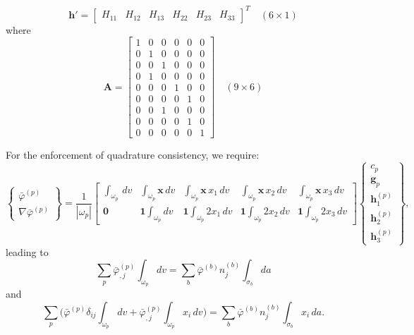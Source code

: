 \documentclass[11pt]{article} %
\begin{document}
\begin{equation}
	\mathbf{h}' =  \left[ \begin{array}{cccccc} H_{11} & H_{12} & H_{13} & H_{22} & H_{23} & H_{33} \end{array} \right]^T \quad (6 \times 1)
\end{equation}
where
\begin{equation}
	\mathbf{A} =  \left[ \begin{array}{cccccc} 1 & 0 & 0 & 0 & 0 & 0 \\ 0 & 1 & 0 & 0 & 0 & 0 \\ 0 & 0 & 1 & 0 & 0 & 0 \\ 0 & 1 & 0 & 0 & 0 & 0 \\ 0 & 0 & 0 & 1 & 0 & 0 \\ 0 & 0 & 0 & 0 & 1 & 0 \\ 0 & 0 & 1 & 0 & 0 & 0 \\ 0 & 0 & 0 & 0 & 1 & 0 \\ 0 & 0 & 0 & 0 & 0 & 1 \end{array} \right] \quad (9 \times 6)
\end{equation}

For the enforcement of quadrature consistency, we require:
\begin{equation}
	\left\{ \begin{array}{c} \bar{\varphi}^{(p)} \\ \nabla \bar{\varphi}^{(p)} \end{array} \right\} = \frac{1}{| \omega_p |} \left[ \begin{array}{ccccc} \int_{\omega_p} \, dv & \int_{\omega_p} \mathbf{x} \, dv & \int_{\omega_p} \mathbf{x} \, x_1 \, dv & \int_{\omega_p} \mathbf{x} \, x_2 \, dv & \int_{\omega_p} \mathbf{x} \, x_3 \, dv \\ \mathbf{0} & \mathbf{1} \int_{\omega_p} dv & \mathbf{1} \int_{\omega_p} 2 x_1 \, dv & \mathbf{1} \int_{\omega_p} 2 x_2 \, dv & \mathbf{1} \int_{\omega_p} 2 x_3 \, dv \end{array} \right] \left\{ \begin{array}{c} c_p \\ \mathbf{g}_p \\ \mathbf{h}^{(p)}_{1} \\ \mathbf{h}^{(p)}_{2} \\ \mathbf{h}^{(p)}_{3} \end{array} \right\} ,
\end{equation}
leading to
\begin{equation}
	\sum_p \bar{\varphi}^{(p)}_{,j} \int_{\omega_p} dv = \sum_{b} \bar{\varphi}^{(b)} n^{(b)}_j \int_{\sigma_b} da
\end{equation}
and
\begin{equation}
	\sum_p \bigg( \bar{\varphi}^{(p)} \delta_{ij} \int_{\omega_p} dv + \bar{\varphi}^{(p)}_{,j} \int_{\omega_p} x_i \, dv \bigg) = \sum_{b} \bar{\varphi}^{(b)} n^{(b)}_j \int_{\sigma_b} x_i \, da .
\end{equation}
\end{document}
